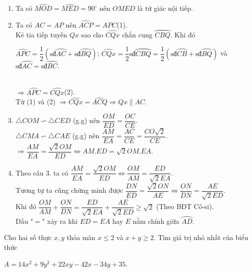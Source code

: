 \begin{ex}
{\begin{center}
\begin{tikzpicture}[scale=1.5]
\end{tikzpicture}
\end{center}
\begin{enumerate}[1.]
\item Ta có $\widehat{MOD}=\widehat{MED}=90^{\circ}$ nên $OMED$ là tứ giác nội tiếp.
\item Ta có $AC=AP$ nên $\widehat{ACP}=\widehat{APC}$\qquad (1).\\
Kẻ tia tiếp tuyến $Qx$ sao cho $\widehat{CQx}$ chắn cung $\wideparen{CBQ}$. Khi đó\\
\centerline{$\widehat{APC}=\dfrac{1}{2}(\text{sđ}\wideparen{AC}+\text{sđ}\wideparen{BQ})$; $\widehat{CQx}=\dfrac{1}{2}\text{sđ}\wideparen{CBQ}=\dfrac{1}{2}(\text{sđ}\wideparen{CB}+\text{sđ}\wideparen{BQ})$ và $\text{sđ}\wideparen{AC}=\text{sđ}\wideparen{BC}$.}\\
$\Rightarrow \widehat{APC}=\widehat{CQx}$\qquad (2).\\
Từ (1) và (2) $\Rightarrow \widehat{CQx}=\widehat{ACQ}\Rightarrow Qx\parallel AC$.
\item $\triangle COM\backsim \triangle CED$ (g.g) nên $\dfrac{OM}{ED}=\dfrac{OC}{CE}$.\\
$\triangle CMA\backsim \triangle CAE$ (g.g) nên $\dfrac{AM}{EA}=\dfrac{AC}{CE}=\dfrac{CO\sqrt{2}}{CE}$.\\
$\Rightarrow \dfrac{AM}{EA}=\dfrac{\sqrt{2}OM}{ED}\Leftrightarrow AM.ED=\sqrt{2}OM.EA$.
\item Theo câu 3. ta có $\dfrac{AM}{EA}=\dfrac{\sqrt{2}OM}{ED}\Leftrightarrow \dfrac{OM}{AM}=\dfrac{ED}{\sqrt{2}EA}$.\\
Tương tự ta cũng chứng minh được $\dfrac{DN}{ED}=\dfrac{\sqrt{2}ON}{AE}\Leftrightarrow \dfrac{ON}{DN}=\dfrac{AE}{\sqrt{2}ED}$.\\
Khi đó $\dfrac{OM}{AM}+\dfrac{ON}{DN}=\dfrac{ED}{\sqrt{2}EA}+\dfrac{AE}{\sqrt{2}ED}\ge \sqrt{2}$ (Theo BĐT Cô-si).\\
Dấu "$=$" xảy ra khi $ED=EA$ hay $E$ nằm chính giữa $\wideparen{AD}$.
\end{enumerate}
}
\end{ex}

\begin{ex}%
Cho hai số thực $x,y$ thỏa mãn $x\le 2$ và $x+y\ge 2$. Tìm giá trị nhỏ nhất của biểu thức
\centerline{$A=14x^2+9y^2+22xy-42x-34y+35$.}
\end{ex}
